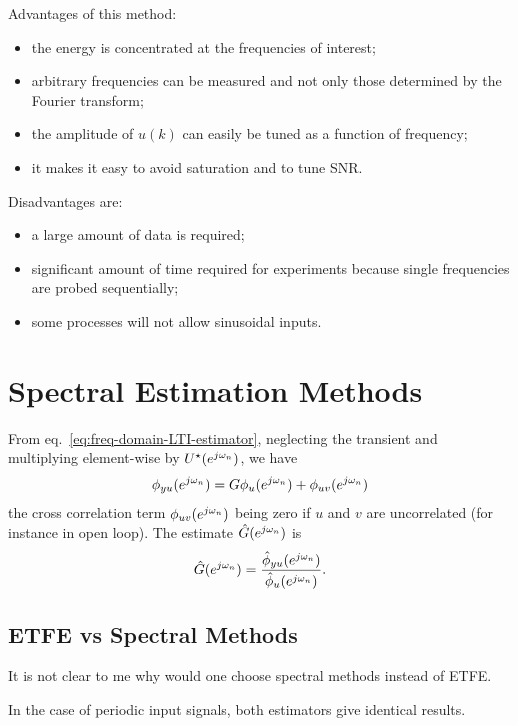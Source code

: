 Advantages of this method:
\begin{itemize}
  \itemsep0em
\item the energy is concentrated at the frequencies of interest;
\item arbitrary frequencies can be measured and not only those determined by the Fourier transform;
\item the amplitude of $u(k)$ can easily be tuned as a function of frequency;
\item it makes it easy to avoid saturation and to tune SNR.
\end{itemize}
Disadvantages are:
\begin{itemize}
  \itemsep0em
\item a large amount of data is required;
\item significant amount of time required for experiments because single frequencies are probed sequentially;
\item some processes will not allow sinusoidal inputs.
\end{itemize}

\iffalse
  \section{Spectral Estimation Methods}
  \label{sec:spectral-estimation-methods}

  From eq.~\eqref{eq:freq-domain-LTI-estimator}, neglecting the transient and multiplying element-wise by $U^\star(e^{j\omega_n})$, we have
  \begin{equation*}
    \phi_{yu}(e^{j\omega_n}) = G \phi_u(e^{j\omega_n}) + \phi_{uv}(e^{j\omega_n})
  \end{equation*}
  the cross correlation term $\phi_{uv}(e^{j\omega_n})$ being zero if $u$ and $v$ are uncorrelated (for instance in open loop). The estimate $\hat{G}(e^{j\omega_n})$ is
  \begin{equation*}
    \hat{G}(e^{j\omega_n}) = \frac{\hat{\phi}_{yu}(e^{j\omega_n})}{\hat{\phi}_u(e^{j\omega_n})}.
  \end{equation*}


  \subsection{ETFE vs Spectral Methods}

  It is not clear to me why would one choose spectral methods instead of ETFE.

  In the case of periodic input signals, both estimators give identical results.

